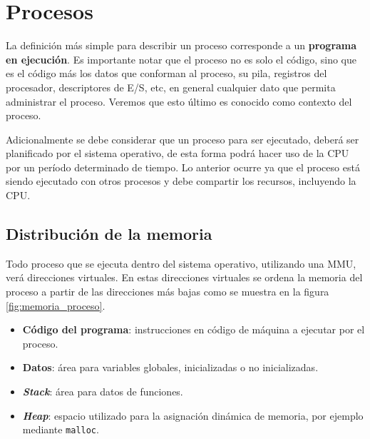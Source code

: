 %
%
%
%

\chapter{Procesos}
\label{procesos}
La definición más simple para describir un proceso corresponde a un
\textbf{programa en ejecución}. Es importante notar que el proceso no es solo el
código, sino que es el código más los datos que conforman al proceso, su pila,
registros del procesador, descriptores de E/S, etc, en general cualquier dato
que permita administrar el proceso. Veremos que esto último es conocido como
contexto del proceso.

Adicionalmente se debe considerar que un proceso para ser ejecutado, deberá ser
planificado por el sistema operativo, de esta forma podrá hacer uso de la CPU
por un período determinado de tiempo. Lo anterior ocurre ya que el proceso
está siendo ejecutado con otros procesos y debe compartir los recursos,
incluyendo la CPU.

\section{Distribución de la memoria}
Todo proceso que se ejecuta dentro del sistema operativo, utilizando una MMU,
verá direcciones virtuales. En estas direcciones virtuales se ordena la memoria
del proceso a partir de las direcciones más bajas como se muestra en la figura
\ref{fig:memoria_proceso}.

\begin{itemize}

	\item \textbf{Código del programa}: instrucciones en código de máquina a
	ejecutar por el proceso.

	\item \textbf{Datos}: área para variables globales, inicializadas o no
	inicializadas.

	\item \textbf{\textit{Stack}}: área para datos de funciones.

	\item \textbf{\textit{Heap}}: espacio utilizado para la asignación
	dinámica de memoria, por ejemplo mediante \texttt{malloc}.

\end{itemize}

